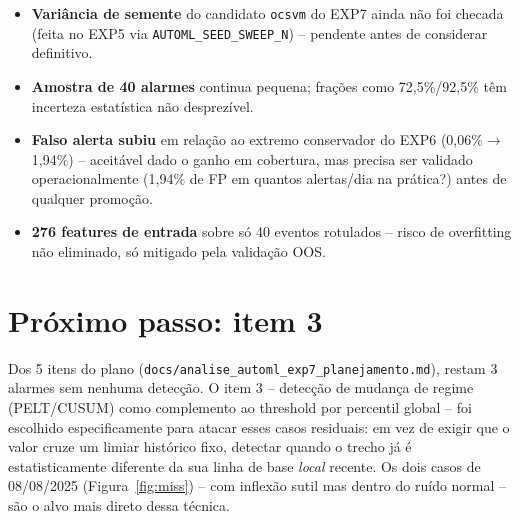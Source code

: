\documentclass[11pt,a4paper]{article}
\begin{document}
\begin{itemize}
  \item \textbf{Variância de semente} do candidato \texttt{ocsvm} do EXP7
        ainda não foi checada (feita no EXP5 via
        \texttt{AUTOML\_SEED\_SWEEP\_N}) -- pendente antes de considerar
        definitivo.
  \item \textbf{Amostra de 40 alarmes} continua pequena; frações como
        72,5\%/92,5\% têm incerteza estatística não desprezível.
  \item \textbf{Falso alerta subiu} em relação ao extremo conservador do
        EXP6 (0,06\%$\to$1,94\%) -- aceitável dado o ganho em cobertura,
        mas precisa ser validado operacionalmente (1,94\% de FP em quantos
        alertas/dia na prática?) antes de qualquer promoção.
  \item \textbf{276 features de entrada} sobre só 40 eventos rotulados --
        risco de overfitting não eliminado, só mitigado pela validação OOS.
\end{itemize}

\section{Próximo passo: item 3}

Dos 5 itens do plano (\texttt{docs/analise\_automl\_exp7\_planejamento.md}),
restam 3 alarmes sem nenhuma detecção. O item 3 -- detecção de mudança de
regime (PELT/CUSUM) como complemento ao threshold por percentil global --
foi escolhido especificamente para atacar esses casos residuais: em vez de
exigir que o valor cruze um limiar histórico fixo, detectar quando o
trecho já é estatisticamente diferente da sua linha de base \emph{local}
recente. Os dois casos de 08/08/2025 (Figura~\ref{fig:miss}) -- com
inflexão sutil mas dentro do ruído normal -- são o alvo mais direto dessa
técnica.
\end{document}
